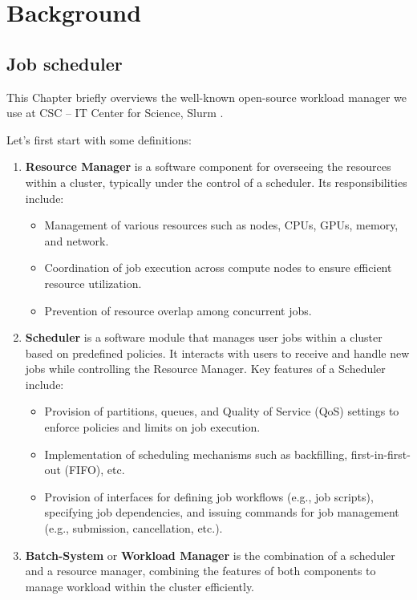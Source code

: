 \chapter{Background}
\label{chap:background}
\section{Job scheduler}
This Chapter briefly overviews the well-known open-source workload manager we use at CSC -- IT Center for Science, Slurm \cite{10.1007/10968987_3}.

Let's first start with some definitions:

\begin{enumerate}
    \item \textbf{Resource Manager} is a software component for overseeing the resources within a cluster, typically under the control of a scheduler. Its responsibilities include:

    \begin{itemize}
        \item Management of various resources such as nodes, CPUs, GPUs, memory, and network.
        \item Coordination of job execution across compute nodes to ensure efficient resource utilization.
        \item Prevention of resource overlap among concurrent jobs.
    \end{itemize}
    \item \textbf{Scheduler} is a software module that manages user jobs within a cluster based on predefined policies. It interacts with users to receive and handle new jobs while controlling the Resource Manager. Key features of a Scheduler include:

    \begin{itemize}
        \item Provision of partitions, queues, and Quality of Service (QoS) settings to enforce policies and limits on job execution.
        \item Implementation of scheduling mechanisms such as backfilling, first-in-first-out (FIFO), etc.
        \item Provision of interfaces for defining job workflows (e.g., job scripts), specifying job dependencies, and issuing commands for job management (e.g., submission, cancellation, etc.).
    \end{itemize}

    \item \textbf{Batch-System} or \textbf{Workload Manager} is the combination of a scheduler and a resource manager, combining the features of both components to manage workload within the cluster efficiently.
\end{enumerate}

